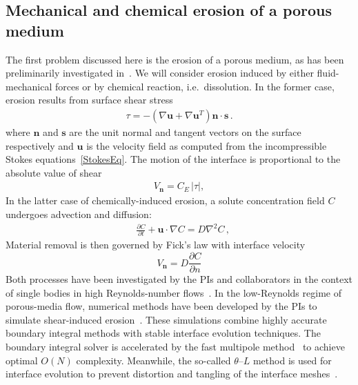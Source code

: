 \documentclass[11pt]{article}
\newcommand{\pd}[2]{ \frac{ \partial #1}{ \partial #2 } }
\newcommand{\bvec}[1]{{\mathbf{#1}}}
\newcommand{\grad}{\nabla}
\newcommand {\Lap} {\grad^2}
\newcommand{\abs}[1]{\left| #1 \right|}
\newcommand{\uu}{\bvec{u}}
\newcommand{\nn}{{\mathbf{n}}}
\renewcommand{\ss}{{\mathbf{s}}}
\newcommand{\Vn}{V_\nn}
\newcommand{\CE}{C_E}
\newcommand {\ny}{n}
\newcommand {\bdry} {\partial B}
\newcommand{\Diff}{D}
\newcommand{\thL}{$\theta$--$L$}
\begin{document}
\subsection{Mechanical and chemical erosion of a porous medium}

The first problem discussed here is the erosion of a porous medium, as has been preliminarily investigated in~\cite{Quaife2018}. We will consider erosion induced by either fluid-mechanical forces or by chemical reaction, i.e.~dissolution. In the former case, erosion results from surface shear stress
\begin{align}
\tau = -\left(\nabla \uu + \nabla \uu^T \right)\nn \cdot \ss \, .
\end{align}
where $\nn$ and $\ss$ are the unit normal and tangent vectors on the surface respectively and $\uu$ is the velocity field as computed from the incompressible Stokes equations~\eqref{StokesEq}. 
The motion of the interface is proportional to the absolute value of shear
\begin{align}
\Vn = \CE \, \abs{\tau},
\end{align}
In the latter case of chemically-induced erosion, a solute concentration field $C$ undergoes advection and diffusion:
\begin{align}
\label{Ceq}
& \pd{C}{t} + \uu \cdot \grad C = \Diff \Lap C \, ,
\end{align}
Material removal is then governed by Fick's law with interface velocity
\begin{equation}
\label{DissVn}
\Vn = \left. \Diff \pd{C}{\ny} \right. %
\end{equation}
Both processes have been investigated by the PIs and collaborators in
the context of single bodies in high Reynolds-number
flows~\cite{Ristroph2012, MoorePOF2013, HuangJFM2015, MooreCPAM2017}. In
the low-Reynolds regime of porous-media flow, numerical methods have
been developed by the PIs to simulate shear-induced
erosion~\cite{Quaife2018}. These simulations combine highly accurate
boundary integral methods with stable interface evolution techniques.
The boundary integral solver is accelerated by the fast multipole
method~\cite{gre-rok1987, gre-gre-may1992} to achieve optimal $O(N)$
complexity. Meanwhile, the so-called {\thL} method is used for interface
evolution to prevent distortion and tangling of the interface meshes~\cite{hou1994removing, MoorePOF2013, Quaife2018}.
\end{document}

